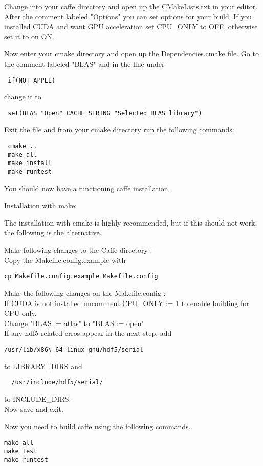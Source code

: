 \documentclass[main.tex]{subfiles}
\begin{document}
 Change into your caffe directory and open up the CMakeLists.txt in your editor. After the comment labeled "Options" you can set options for your build. If you installed CUDA and want GPU acceleration set CPU\_ONLY to OFF, otherwise set it to on ON.
 
 Now enter your cmake directory and open up the Dependencies.cmake file. Go to the comment labeled "BLAS" and in the line under 
 
 \begin{lstlisting}
 if(NOT APPLE)
\end{lstlisting}
 
 change it to 
 
 \begin{lstlisting}
 set(BLAS "Open" CACHE STRING "Selected BLAS library")
\end{lstlisting}
 
 Exit the file and from your cmake directory run the following commands:
 \begin{lstlisting}
 cmake ..
 make all
 make install
 make runtest
\end{lstlisting}
 You should now have a functioning caffe installation.

\newpage
 
 
 
 
Installation with make:

The installation with cmake is highly recommended, but if this should not work, the following is the alternative.

 Make following changes to the Caffe directory : \\

Copy the Makefile.config.example with 
\begin{lstlisting}
cp Makefile.config.example Makefile.config
\end{lstlisting}
Make the following changes on the Makefile.config :\\

If CUDA is not installed uncomment CPU\_ONLY := 1 to enable building for CPU only.\\
Change "BLAS := atlas" to "BLAS := open"\\
If any hdf5 related erros appear in the next step, add 
\begin{lstlisting}
/usr/lib/x86\_64-linux-gnu/hdf5/serial
\end{lstlisting}
 to LIBRARY\_DIRS and
\begin{lstlisting} 
  /usr/include/hdf5/serial/ 
\end{lstlisting} 
  to INCLUDE\_DIRS.\\
Now save and exit.

 	
Now you need to build caffe using the following commands.
\begin{lstlisting}
make all
make test
make runtest  
\end{lstlisting}

 
\end{document}
